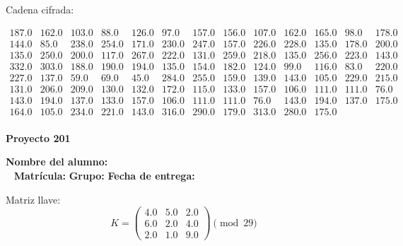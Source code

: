 \documentclass[12pt]{article}
\begin{document}
Cadena cifrada:
\begin{center}
$\begin{array}{lllllllllllll}
187.0 & 162.0 & 103.0 & 88.0 & 126.0 & 97.0 & 157.0 & 156.0 & 107.0 & 162.0 & 165.0 & 98.0 & 178.0\\
144.0 & 85.0 & 238.0 & 254.0 & 171.0 & 230.0 & 247.0 & 157.0 & 226.0 & 228.0 & 135.0 & 178.0 & 200.0\\
135.0 & 250.0 & 200.0 & 117.0 & 267.0 & 222.0 & 131.0 & 259.0 & 218.0 & 135.0 & 256.0 & 223.0 & 143.0\\
332.0 & 303.0 & 188.0 & 190.0 & 194.0 & 135.0 & 154.0 & 182.0 & 124.0 & 99.0 & 116.0 & 83.0 & 220.0\\
227.0 & 137.0 & 59.0 & 69.0 & 45.0 & 284.0 & 255.0 & 159.0 & 139.0 & 143.0 & 105.0 & 229.0 & 215.0\\
131.0 & 206.0 & 209.0 & 130.0 & 132.0 & 172.0 & 115.0 & 133.0 & 157.0 & 106.0 & 111.0 & 111.0 & 76.0\\
143.0 & 194.0 & 137.0 & 133.0 & 157.0 & 106.0 & 111.0 & 111.0 & 76.0 & 143.0 & 194.0 & 137.0 & 175.0\\
164.0 & 105.0 & 234.0 & 221.0 & 143.0 & 316.0 & 290.0 & 179.0 & 313.0 & 280.0 & 175.0\\
\end{array}$
\end{center}

\newpage


\textbf{Proyecto 201}

\textbf{Nombre del alumno:} \underline{\hspace{13cm}}\\\
\vspace{1cm}
\textbf{Matrícula:} \underline{\hspace{4cm}} \hspace{1cm}
\textbf{Grupo:} \underline{\hspace{2cm}}
\textbf{Fecha de entrega:} \underline{\hspace{2cm}}

\medskip

Matriz llave:
\[
K = \begin{pmatrix}
4.0 & 5.0 & 2.0\\
6.0 & 2.0 & 4.0\\
2.0 & 1.0 & 9.0
\end{pmatrix} \pmod{29}
\]
\end{document}

